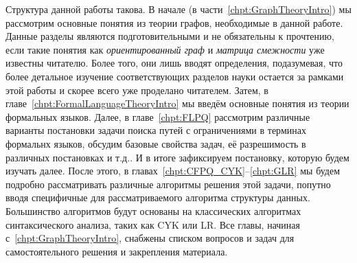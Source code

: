 Структура данной работы такова.
В начале (в части~\ref{chpt:GraphTheoryIntro}) мы рассмотрим основные понятия из теории графов, необходимые в данной работе. Данные разделы являются подготовительными и не обязательны к прочтению, если такие понятия как \textit{ориентированный граф} и \textit{матрица смежности} уже известны читателю. Более того, они лишь вводят определения, подазумевая, что более детальное изучение соответствующих разделов науки остается за рамками этой работы и скорее всего уже проделано читателем.
Затем, в главе~\ref{chpt:FormalLanguageTheoryIntro} мы введём основные понятия из теории формальных языков.
Далее, в главе~\ref{chpt:FLPQ} рассмотрим различные варианты постановки задачи поиска путей с ограничениями в терминах формальнх языков, обсудим базовые свойства задач, её разрешимость в различных постановках и т.д..
И в итоге зафиксируем постановку, которую будем изучать далее.
После этого, в главах~\ref{chpt:CFPQ_CYK}--\ref{chpt:GLR} мы будем подробно рассматривать различные алгоритмы решения этой задачи, попутно вводя специфичные для рассматриваемого алгоритма структуры данных.
Большинство алгоритмов будут основаны на классических алгоритмах синтаксического анализа, таких как CYK или LR.
Все главы, начиная с~\ref{chpt:GraphTheoryIntro}, снабжены списком вопросов и задач для самостоятельного решения и закрепления материала.
